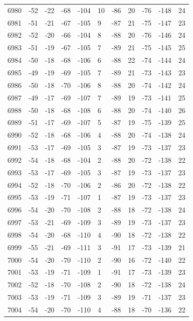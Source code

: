 \begin{table}[H]
\begin{tabular}{lllllllllll}
6980 & -52 & -22 & -68 & -104 & 10 & -86 & 20 & -76 & -148 & 24 \\
6981 & -51 & -21 & -67 & -105 & 9 & -87 & 21 & -75 & -147 & 23 \\
6982 & -52 & -20 & -66 & -104 & 8 & -88 & 20 & -76 & -146 & 24 \\
6983 & -51 & -19 & -67 & -105 & 7 & -89 & 21 & -75 & -145 & 25 \\
6984 & -50 & -18 & -68 & -106 & 6 & -88 & 22 & -74 & -144 & 24 \\
6985 & -49 & -19 & -69 & -105 & 7 & -89 & 21 & -73 & -143 & 23 \\
6986 & -50 & -18 & -70 & -106 & 8 & -88 & 20 & -74 & -142 & 24 \\
6987 & -49 & -17 & -69 & -107 & 7 & -89 & 19 & -73 & -141 & 25 \\
6988 & -50 & -18 & -68 & -108 & 6 & -88 & 20 & -74 & -140 & 26 \\
6989 & -51 & -17 & -69 & -107 & 5 & -87 & 19 & -75 & -139 & 25 \\
6990 & -52 & -18 & -68 & -106 & 4 & -88 & 20 & -74 & -138 & 24 \\
6991 & -53 & -17 & -69 & -105 & 3 & -87 & 19 & -73 & -137 & 23 \\
6992 & -54 & -18 & -68 & -104 & 2 & -88 & 20 & -72 & -138 & 22 \\
6993 & -53 & -17 & -69 & -105 & 3 & -87 & 19 & -73 & -137 & 23 \\
6994 & -52 & -18 & -70 & -106 & 2 & -86 & 20 & -72 & -138 & 22 \\
6995 & -53 & -19 & -71 & -107 & 1 & -87 & 19 & -73 & -137 & 23 \\
6996 & -54 & -20 & -70 & -108 & 2 & -88 & 18 & -72 & -138 & 24 \\
6997 & -53 & -21 & -69 & -109 & 3 & -89 & 19 & -73 & -137 & 23 \\
6998 & -54 & -20 & -68 & -110 & 4 & -90 & 18 & -72 & -138 & 22 \\
6999 & -55 & -21 & -69 & -111 & 3 & -91 & 17 & -73 & -139 & 21 \\
7000 & -54 & -20 & -70 & -110 & 2 & -90 & 16 & -72 & -140 & 22 \\
7001 & -53 & -19 & -71 & -109 & 1 & -91 & 17 & -73 & -139 & 23 \\
7002 & -52 & -18 & -70 & -108 & 2 & -90 & 18 & -72 & -138 & 24 \\
7003 & -53 & -19 & -71 & -109 & 3 & -89 & 19 & -71 & -137 & 23 \\
7004 & -54 & -20 & -70 & -110 & 4 & -88 & 18 & -70 & -136 & 22 \\

\end{tabular}
\end{table}
